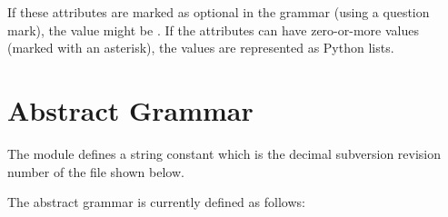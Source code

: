 If these attributes are marked as optional in the grammar (using a
question mark), the value might be . If the attributes
can have zero-or-more values (marked with an asterisk), the
values are represented as Python lists.

\section{Abstract Grammar}

The module defines a string constant  which
is the decimal subversion revision number of the file shown below.

The abstract grammar is currently defined as follows:



